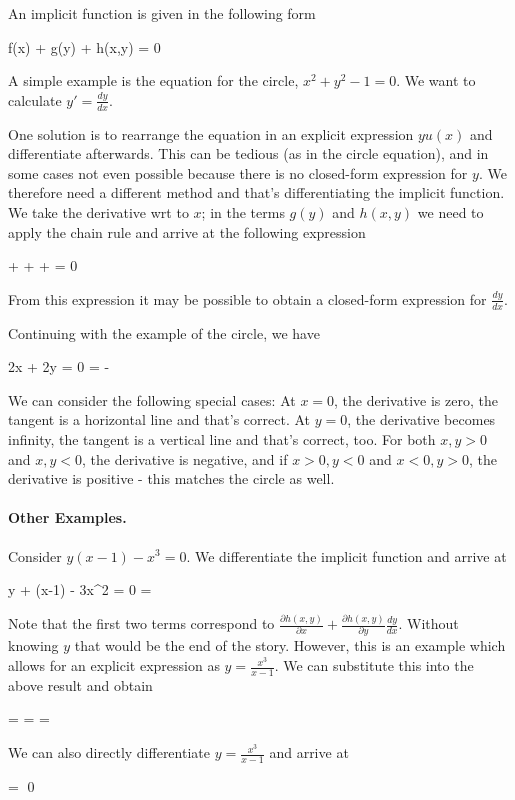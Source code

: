 
An implicit function is given in the following form

\bee
f(x) + g(y) + h(x,y) = 0
\eee

A simple example is the equation for the circle, $x^2 + y^2 - 1 = 0$. We want to calculate $y' = \frac{dy}{dx}$.

One solution is to rearrange the equation in an explicit expression $y u(x)$ and differentiate afterwards. This can be tedious (as in the circle equation), and in some cases not even possible because there is no closed-form expression for $y$. We therefore need a different method and that's differentiating the implicit function. We take the derivative wrt to $x$; in the terms $g(y)$ and $h(x,y)$ we need to apply the chain rule and arrive at the following expression

\bee
{} +   +  +  = 0
\eee

From this expression it may be possible to obtain a closed-form expression for $\frac{dy}{dx}$.

Continuing with the example of the circle, we have

\bee
2x + 2y  = 0 \rightarrow {} = -
\eee

We can consider the following special cases: At $x=0$, the derivative is zero, the tangent is a horizontal line and that's correct. At $y=0$, the derivative becomes infinity, the tangent is a vertical line and that's correct, too. For both $x,y > 0$ and $x,y<0$, the derivative is negative, and if $x>0, y<0$ and $x<0, y>0$, the derivative is positive - this matches the circle as well.

\paragraph{Other Examples.} Consider $y(x-1) - x^3 = 0$. We differentiate the implicit function and arrive at

\bee
y + (x-1)  - 3x^2 = 0 \rightarrow {} = 
\eee

Note that the first two terms correspond to $\frac{\partial h(x,y)}{\partial x} + \frac{\partial h(x,y)}{\partial y}\frac{dy}{dx}$. Without knowing $y$ that would be the end of the story. However, this is an example which allows for an explicit expression as $y = \frac{x^3}{x-1}$. We can substitute this into the above result and obtain

\bee
{} =  =  = 
\eee

We can also directly differentiate $y = \frac{x^3}{x-1}$ and arrive at

\bee
{} =  \qed
\eee

